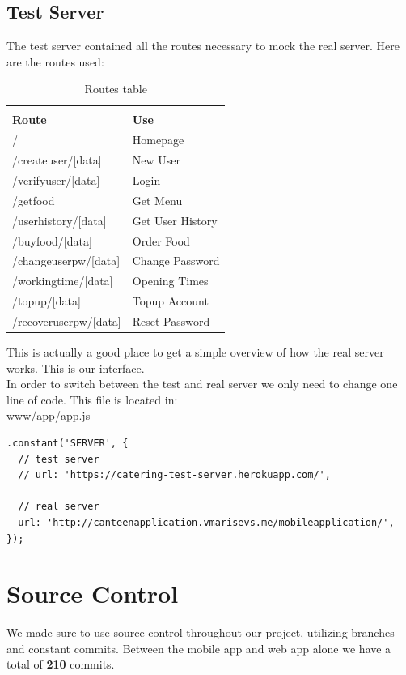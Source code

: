 \subsection{Test Server}
The test server contained all the routes necessary to mock the real server.
Here are the routes used:
	    \begin{table}[H]
	    	\centering
	    	\begin{tabular}{p{8cm}p{5cm}}
	    		\toprule \\
	    		\textbf{Route} & \textbf{Use} \\ \hline
	    		/ & Homepage \\  \hline
	    		/createuser/[data] & New User \\ \hline
	    		/verifyuser/[data] & Login \\ \hline
	    		/getfood & Get Menu \\ \hline
	    		/userhistory/[data] & Get User History \\ \hline
	    		/buyfood/[data] & Order Food \\ \hline
	    		/changeuserpw/[data] & Change Password \\ \hline
	    		/workingtime/[data] & Opening Times \\ \hline
	    		/topup/[data] & Topup Account\\ \hline
	    		/recoveruserpw/[data] & Reset Password \\ \hline
	    		\bottomrule
	    	\end{tabular}
	    	\caption{Routes table}
	    	\label{table:RoutesTable}
	    \end{table}
This is actually a good place to get a simple overview of how the real server works.
This is our interface.
\\
In order to switch between the test and real server we only need to change one line of code.
This file is located in:
\\
www/app/app.js
\begin{verbatim}
.constant('SERVER', {
  // test server
  // url: 'https://catering-test-server.herokuapp.com/',
  	
  // real server
  url: 'http://canteenapplication.vmarisevs.me/mobileapplication/',
});
\end{verbatim}
\section{Source Control}
We made sure to use source control throughout our project, utilizing branches and constant commits.
Between the mobile app and web app alone we have a total of \textbf{210} commits.

